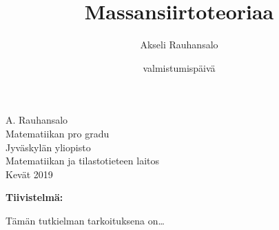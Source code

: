 
\title{Massansiirtoteoriaa}
\author{Akseli Rauhansalo}
\date{valmistumispäivä}


\thispagestyle{empty}                   %
\begin{center}                          %
\null\vspace{3cm}                       %
\Large                                  %
\large                                  %
A. Rauhansalo\\[1cm]                    %
\vfill                                  %
\normalsize                             %
Matematiikan pro gradu\\[1cm]           %
Jyväskylän yliopisto\\                  %
Matematiikan ja tilastotieteen laitos\\ %
Kevät 2019                              %
\end{center}                            %
\frontmatter

\noindent
\textbf{Tiivistelmä:}

\vspace{1pc}
Tämän tutkielman tarkoituksena on\dots


\newpage
\setcounter{tocdepth}{2}
\thispagestyle{empty}
\tableofcontents

\thispagestyle{empty}


